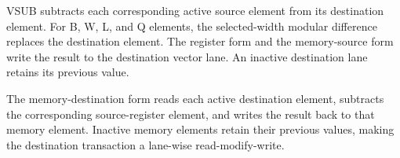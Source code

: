 VSUB subtracts each corresponding active source element from its destination
element. For B, W, L, and Q elements, the selected-width modular difference
replaces the destination element. The register form and the memory-source form
write the result to the destination vector lane. An inactive destination lane
retains its previous value.

The memory-destination form reads each active destination element, subtracts
the corresponding source-register element, and writes the result back to that
memory element. Inactive memory elements retain their previous values, making
the destination transaction a lane-wise read-modify-write.
